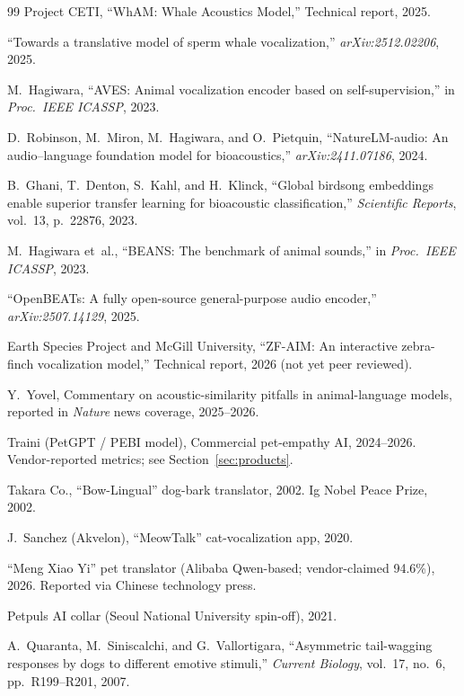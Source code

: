 \begin{thebibliography}{99}
Project CETI, ``WhAM: Whale Acoustics Model,'' Technical report, 2025.

``Towards a translative model of sperm whale vocalization,''
\emph{arXiv:2512.02206}, 2025.

M.~Hagiwara, ``AVES: Animal vocalization encoder based on self-supervision,''
in \emph{Proc.\ IEEE ICASSP}, 2023.

D.~Robinson, M.~Miron, M.~Hagiwara, and O.~Pietquin,
``NatureLM-audio: An audio--language foundation model for bioacoustics,''
\emph{arXiv:2411.07186}, 2024.

B.~Ghani, T.~Denton, S.~Kahl, and H.~Klinck,
``Global birdsong embeddings enable superior transfer learning for bioacoustic
classification,'' \emph{Scientific Reports}, vol.~13, p.~22876, 2023.

M.~Hagiwara et~al., ``BEANS: The benchmark of animal sounds,''
in \emph{Proc.\ IEEE ICASSP}, 2023.

``OpenBEATs: A fully open-source general-purpose audio encoder,''
\emph{arXiv:2507.14129}, 2025.

Earth Species Project and McGill University,
``ZF-AIM: An interactive zebra-finch vocalization model,'' Technical report,
2026 (not yet peer reviewed).

Y.~Yovel, Commentary on acoustic-similarity pitfalls in animal-language
models, reported in \emph{Nature} news coverage, 2025--2026.

Traini (PetGPT / PEBI model), Commercial pet-empathy AI, 2024--2026.
Vendor-reported metrics; see Section~\ref{sec:products}.

Takara Co., ``Bow-Lingual'' dog-bark translator, 2002.
Ig Nobel Peace Prize, 2002.

J.~Sanchez (Akvelon), ``MeowTalk'' cat-vocalization app, 2020.

``Meng Xiao Yi'' pet translator (Alibaba Qwen-based; vendor-claimed 94.6\%),
2026. Reported via Chinese technology press.

Petpuls AI collar (Seoul National University spin-off), 2021.

A.~Quaranta, M.~Siniscalchi, and G.~Vallortigara,
``Asymmetric tail-wagging responses by dogs to different emotive stimuli,''
\emph{Current Biology}, vol.~17, no.~6, pp.~R199--R201, 2007.


\end{thebibliography}
